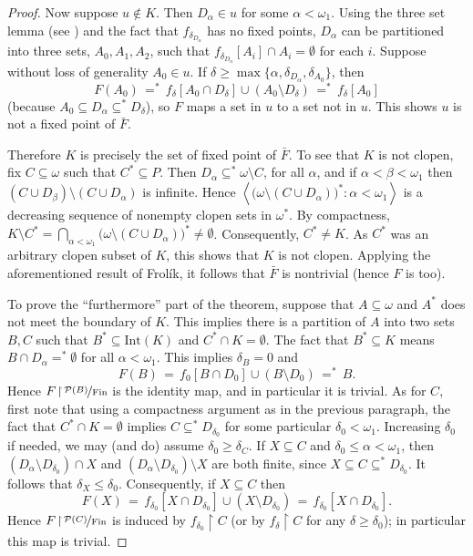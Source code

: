 \documentclass[11pt,leqno]{amsart}
\theoremstyle{definition}
\theoremstyle{remark}
\renewcommand{\P}{\mathcal{P}}
\newcommand{\brackets}[1]{\left\langle #1 \right\rangle}
\newcommand{\seq}[2]{\brackets{#1 \colon #2}}
\newcommand{\<}{\langle}
\renewcommand{\>}{\rangle}
\renewcommand{\a}{\alpha}
\renewcommand{\b}{\beta}
\newcommand{\dlt}{\delta}
\newcommand{\w}{\omega}
\newcommand{\0}{\emptyset}
\newcommand{\sub}{\subseteq}
\newcommand{\rest}{\!\restriction\!}
\newcommand{\1}{1\hspace{-1.75mm}1}
\begin{document}
\begin{proof}
Now suppose $u \notin K$. Then $D_\a \in u$ for some $\a < \w_1$. Using the three set lemma (see \cite{EdB}) and the fact that $f_{\dlt_{D_\a}}$ has no fixed points, $D_\a$ can be partitioned into three sets, $A_0, A_1, A_2$, such that $f_{\dlt_{D_\a}}[A_i] \cap A_i = \0$ for each $i$. Suppose without loss of generality $A_0 \in u$. If $\dlt \geq \max\{ \a,\dlt_{D_\a},\dlt_{A_0} \}$, then  
$$F(A_0) \,=^*\, f_\dlt[A_0 \cap D_\dlt] \cup (A_0 \setminus D_\dlt) \,=^*\, f_\dlt[A_0]$$
(because $A_0 \sub D_\a \sub^* D_\dlt$), so $F$ maps a set in $u$ to a set not in $u$. This shows $u$ is not a fixed point of $\bar F$. 

Therefore $K$ is precisely the set of fixed point of $\bar F$. To see that $K$ is not clopen, fix $C \sub \w$ such that $C^* \sub P$. 
Then $D_\a \sub^* \w \setminus C$, for all $\a$, and  
if $\a < \b < \w_1$ then $(C \cup D_\b) \setminus (C \cup D_\a)$ is infinite. 
Hence $\seq{\big( \w \setminus (C \cup D_\a) \big)^*}{ \a < \w_1 }$ is a decreasing sequence of nonempty clopen sets in $\w^*$. By compactness, $K \setminus C^* = \bigcap_{\a < \w_1} \big( \w \setminus (C \cup D_\a) \big)^* \neq \0$. Consequently, $C^* \neq K$. As $C^*$ was an arbitrary clopen subset of $K$, this shows that $K$ is not clopen. Applying the aforementioned result of Frol\'ik, it follows that $\bar F$ is nontrivial (hence $F$ is too).

To prove the ``furthermore'' part of the theorem, suppose that $A \sub \w$ and $A^*$ does not meet the boundary of $K$. This implies there is a partition of $A$ into two sets $B,C$ such that $B^* \sub \mathrm{Int}(K)$ and $C^* \cap K = \0$. 
The fact that $B^* \sub K$ means $B \cap D_\a =^* \0$ for all $\a < \w_1$. This implies $\dlt_B = 0$ and 
$$F(B) \,=\, f_0[B \cap D_0] \cup (B \setminus D_0) \,=^*\, B.$$ 
Hence $F \rest \nicefrac{\P(B)}{\mathrm{Fin}}$ is the identity map, and in particular it is trivial. 
As for $C$, first note that using a compactness argument as in the previous paragraph, the fact that $C^* \cap K = \0$ implies $C \sub^* D_{\dlt_0}$ for some particular $\dlt_0 < \w_1$. 
Increasing $\dlt_0$ if needed, we may (and do) assume $\dlt_0 \geq \dlt_C$. 
If $X \sub C$ and $\dlt_0 \leq \a < \w_1$, then 
$(D_\a \setminus D_{\dlt_0}) \cap X$ and $(D_\a \setminus D_{\dlt_0}) \setminus X$ are both finite, since $X \sub C \sub^* D_{\dlt_0}$. 
It follows that $\dlt_X \leq \dlt_0$. 
Consequently, if $X \sub C$ then 
$$F(X) \,=\, f_{\dlt_0}[X \cap D_{\dlt_0}] \cup (X \setminus D_{\dlt_0}) \,=\, f_{\dlt_0}[X \cap D_{\dlt_0}].$$ 
Hence $F \rest \nicefrac{\P(C)}{\mathrm{Fin}}$ is induced by $f_{\dlt_0} \rest C$ (or by $f_\dlt \rest C$ for any $\dlt \geq \dlt_0$); in particular this map is trivial. 


\end{proof}
\end{document}
